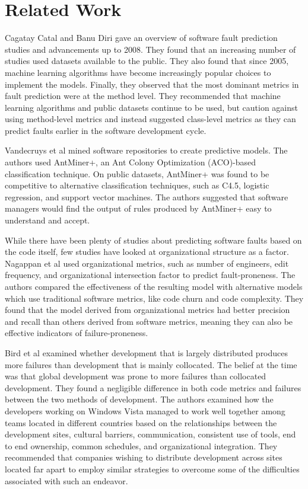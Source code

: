 \documentclass{sig-alternate-05-2015}
\begin{document}
\section{Related Work}
Cagatay Catal and Banu Diri \cite{Catal} gave an overview of software fault prediction studies and advancements up to 2008. They found that an increasing number of studies used datasets available to the public. They also found that since 2005, machine learning algorithms have become increasingly popular choices to implement the models. Finally, they observed that the most dominant metrics in fault prediction were at the method level. They recommended that machine learning algorithms and public datasets continue to be used, but caution against using method-level metrics and instead suggested class-level metrics as they can predict faults earlier in the software development cycle.

Vandecruys et al \cite{Vandecruys} mined software repositories to create predictive models. The authors used AntMiner+, an Ant Colony Optimization (ACO)-based classification technique. On public datasets, AntMiner+ was found to be competitive to alternative classification techniques, such as C4.5, logistic regression, and support vector machines. The authors suggested that software managers would find the output of rules produced by AntMiner+ easy to understand and accept.

While there have been plenty of studies about predicting software faults based on the code itself, few studies have looked at organizational structure as a factor. Nagappan et al \cite{Nagappan} used organizational metrics, such as number of engineers, edit frequency, and organizational intersection factor to predict fault-proneness. The authors compared the effectiveness of the resulting model with alternative models which use traditional software metrics, like code churn and code complexity. They found that the model derived from organizational metrics had better precision and recall than others derived from software metrics, meaning they can also be effective indicators of failure-proneness.

Bird et al \cite{Bird} examined whether development that is largely distributed produces more failures than development that is mainly collocated. The belief at the time was that global development was prone to more failures than collocated development. They found a negligible difference in both code metrics and failures between the two methods of development. The authors examined how the developers working on Windows Vista managed to work well together among teams located in different countries based on the relationships between the development sites, cultural barriers, communication, consistent use of tools, end to end ownership, common schedules, and organizational integration. They recommended that companies wishing to distribute development across sites located far apart to employ similar strategies to overcome some of the difficulties associated with such an endeavor. 
\end{document}
